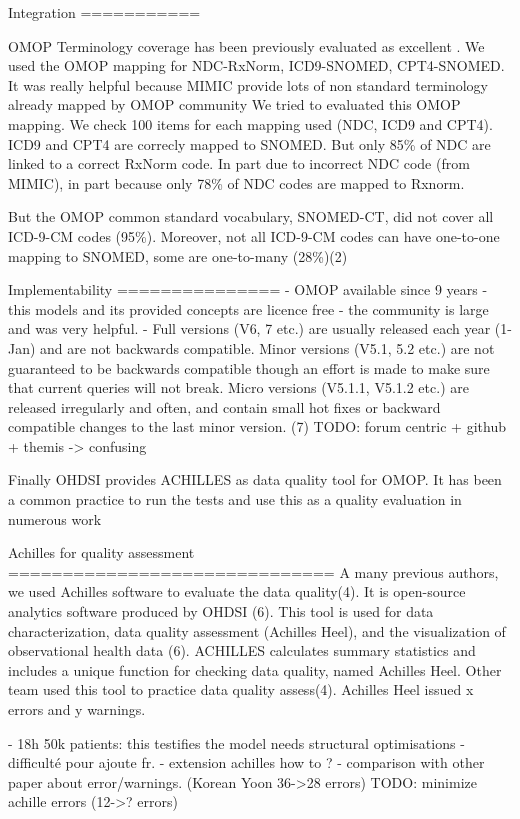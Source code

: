 Integration
===========

OMOP Terminology coverage has been previously evaluated as excellent
\cite{omop-vs-pcornet}. We used the OMOP mapping for NDC-RxNorm, ICD9-SNOMED,
CPT4-SNOMED. It was really helpful because MIMIC provide lots of non standard
terminology already mapped by OMOP community
We tried to evaluated this OMOP mapping.
We check 100 items for each mapping used (NDC, ICD9 and CPT4). ICD9 and CPT4 are correcly mapped to SNOMED. But only 85\% of NDC are
linked to a correct RxNorm code. In part due to incorrect NDC code (from MIMIC), in part because only 78\% of NDC codes are mapped to Rxnorm.

But the OMOP common standard vocabulary, SNOMED-CT, did not cover all ICD-9-CM codes (95\%). Moreover, not all ICD-9-CM codes can have one-to-one mapping to SNOMED, some are one-to-many (28\%)(2)
 
Implementability
===============
- OMOP available since 9 years
- this models and its provided concepts are licence free
- the community is large and was very helpful.
- Full versions (V6, 7 etc.) are usually released each year (1-Jan) and are not backwards compatible. 
Minor versions (V5.1, 5.2 etc.) are not guaranteed to be backwards compatible though an effort is made to make sure that current queries will not break. 
Micro versions (V5.1.1, V5.1.2 etc.) are released irregularly and often, and contain small hot fixes or backward compatible changes to the last minor version.
(7)
TODO: forum centric + github + themis -> confusing


Finally OHDSI provides ACHILLES as data quality tool for OMOP. It has been a
common practice to run the tests and use this as a quality evaluation in
numerous work \cite{achilles-papers}

Achilles for quality assessment
==============================
A many previous authors, we used Achilles software to evaluate the data
quality(4). It is open-source analytics software produced by OHDSI (6).  This
tool is used for data characterization, data quality assessment (Achilles
Heel), and the visualization of observational health data (6).  ACHILLES
calculates summary statistics and includes a unique function for checking data
quality, named Achilles Heel. 
Other team used this tool to practice data quality assess(4).
Achilles Heel issued x errors and y warnings.

- 18h 50k patients: this testifies the model needs structural optimisations
- difficulté pour ajoute fr. 
- extension achilles how to ?
- comparison with other paper about error/warnings. (Korean Yoon 36->28 errors)
TODO: minimize achille errors  (12->? errors)


